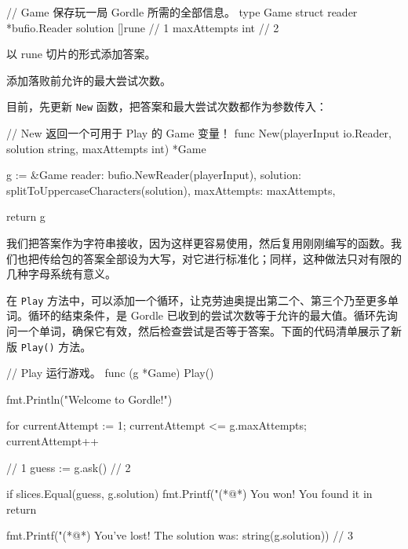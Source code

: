 \begin{gocode}[title={代码清单 5.18 \texttt{game.go}：添加答案和最大尝试次数}]
// Game 保存玩一局 Gordle 所需的全部信息。
type Game struct {
    reader      *bufio.Reader
    solution    []rune // 1
    maxAttempts int    // 2
}
\end{gocode}

\begin{codeannotations}
  \item 以 rune 切片的形式添加答案。
  \item 添加落败前允许的最大尝试次数。
\end{codeannotations}

目前，先更新 \texttt{New} 函数，把答案和最大尝试次数都作为参数传入：

\begin{gocode}[]
// New 返回一个可用于 Play 的 Game 变量！
func New(playerInput io.Reader, solution string, maxAttempts int) *Game {
    g := &Game{
        reader:      bufio.NewReader(playerInput),
        solution:    splitToUppercaseCharacters(solution),
        maxAttempts: maxAttempts,
    }

    return g
}
\end{gocode}

我们把答案作为字符串接收，因为这样更容易使用，然后复用刚刚编写的函数。我们也把传给包的答案全部设为大写，对它进行标准化；同样，这种做法只对有限的几种字母系统有意义。

在 \texttt{Play} 方法中，可以添加一个循环，让克劳迪奥提出第二个、第三个乃至更多单词。循环的结束条件，是 Gordle 已收到的尝试次数等于允许的最大值。循环先询问一个单词，确保它有效，然后检查尝试是否等于答案。下面的代码清单展示了新版 \texttt{Play()} 方法。

\begin{gocode}[title={代码清单 5.19 \texttt{game.go}：添加胜利检查}]
// Play 运行游戏。
func (g *Game) Play() {
    fmt.Println("Welcome to Gordle!")

    for currentAttempt := 1; currentAttempt <= g.maxAttempts; currentAttempt++ { // 1
        guess := g.ask() // 2

        if slices.Equal(guess, g.solution) {
            fmt.Printf("(*@\PocketParty@*) You won! You found it in %
            return
        }
    }

    fmt.Printf("(*@\PocketSad@*) You've lost! The solution was: %
        string(g.solution)) // 3
}
\end{gocode}

